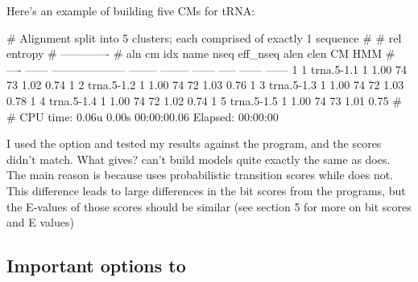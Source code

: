 Here's an example of building five  CMs for tRNA:

\begin{sreoutput}
# Alignment split into 5 clusters; each comprised of exactly 1 sequence
#
#                                                                  rel entropy 
#                                                                 -------------
# aln  cm idx name                     nseq eff_nseq   alen  clen     CM    HMM
# ---- ------ -------------------- -------- -------- ------ ----- ------ ------
     1      1 trna.5-1.1                  1     1.00     74    73   1.02   0.74
     1      2 trna.5-1.2                  1     1.00     74    72   1.03   0.76
     1      3 trna.5-1.3                  1     1.00     74    72   1.03   0.78
     1      4 trna.5-1.4                  1     1.00     74    72   1.02   0.74
     1      5 trna.5-1.5                  1     1.00     74    73   1.01   0.75
#
# CPU time: 0.06u 0.00s 00:00:00.06 Elapsed: 00:00:00
\end{sreoutput}

\begin{srefaq}{I used the  option and tested my
results against the  program, and the scores didn't
match. What gives?}  can't build models quite exactly the
  same as  does. The main reason is because
  \software uses probabilistic transition scores while
   does not. This difference leads to large
  differences in the bit scores from the programs, but the E-values of
  those scores should be similar (see section 5 for more on bit scores
  and E values)
\end{srefaq}

\newpage
\subsection{Important options to }

